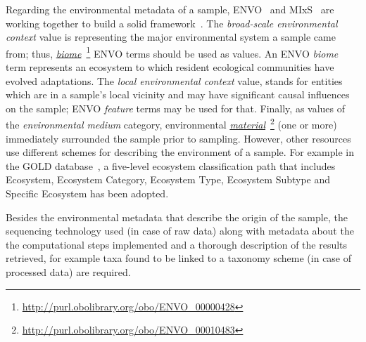       Regarding the environmental metadata of a sample, 
      ENVO~\citep{buttigieg2016environment} and MIxS~\citep{yilmaz2011minimum}
      are working together to build a solid framework~\citep{environmentontology_2021}. 
      The \textit{broad-scale environmental context} value is representing the 
      major environmental system a sample came from;
      thus, \textit{\href{http://purl.obolibrary.org/obo/ENVO_00000428}{biome}}~\footnote{\href{http://purl.obolibrary.org/obo/ENVO_00000428}{http://purl.obolibrary.org/obo/ENVO\_00000428}} 
      ENVO terms should be used as values. 
      An ENVO \textit{biome} term represents an ecosystem to which resident ecological communities have evolved adaptations.
      The \textit{local environmental context} value, stands for 
      entities which are in a sample's local vicinity and may have significant causal influences on the sample; 
      ENVO \textit{feature} terms may be used for that.
      Finally, 
      as values of the \textit{environmental medium} 
      category, 
      environmental \textit{\href{http://purl.obolibrary.org/obo/ENVO_00010483}{material}}~\footnote{\href{http://purl.obolibrary.org/obo/ENVO_00010483}{http://purl.obolibrary.org/obo/ENVO\_00010483}} (one or more) 
      immediately surrounded 
      the sample prior to sampling.
      However, other resources 
      use different schemes for describing the environment of a sample.
      For example in the GOLD database~\citep{mukherjee2021genomes},
      a five-level ecosystem classification path that includes 
      Ecosystem, Ecosystem Category, Ecosystem Type, Ecosystem Subtype and
      Specific Ecosystem
      has been adopted. 

      Besides the environmental metadata that describe the origin of the sample,
      the sequencing technology used (in case of raw data)
      along with metadata about the
      the computational steps implemented 
      and a thorough description of the results retrieved, for example  
      taxa found to be linked to a taxonomy scheme (in case of processed data)
      are required. 
      
